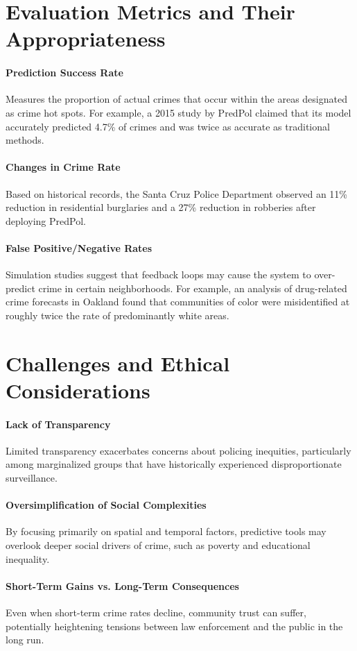 \documentclass{article}
\begin{document}
\section{Evaluation Metrics and Their Appropriateness}
\paragraph{Prediction Success Rate} Measures the proportion of actual crimes that occur within the areas designated as crime hot spots. For example, a 2015 study by PredPol claimed that its model accurately predicted 4.7\% of crimes and was twice as accurate as traditional methods.
\paragraph{Changes in Crime Rate} Based on historical records, the Santa Cruz Police Department observed an 11\% reduction in residential burglaries and a 27\% reduction in robberies after deploying PredPol.
\paragraph{False Positive/Negative Rates} Simulation studies suggest that feedback loops may cause the system to over-predict crime in certain neighborhoods. For example, an analysis of drug-related crime forecasts in Oakland found that communities of color were misidentified at roughly twice the rate of predominantly white areas.

\section{Challenges and Ethical Considerations}
\paragraph{Lack of Transparency} Limited transparency exacerbates concerns about policing inequities, particularly among marginalized groups that have historically experienced disproportionate surveillance.
\paragraph{Oversimplification of Social Complexities} By focusing primarily on spatial and temporal factors, predictive tools may overlook deeper social drivers of crime, such as poverty and educational inequality.
\paragraph{Short-Term Gains vs. Long-Term Consequences} Even when short-term crime rates decline, community trust can suffer, potentially heightening tensions between law enforcement and the public in the long run.

\newpage


\end{document}

